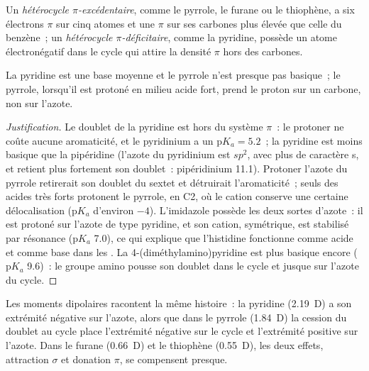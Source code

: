 \begin{definition}\label{def:b3:heterocycles:pi-character}
Un \emph{hétérocycle $\pi$-excédentaire}, comme le
pyrrole, le furane ou le thiophène, a six électrons $\pi$ sur cinq atomes et une  $\pi$ sur ses carbones plus élevée que celle du benzène~; un \emph{hétérocycle $\pi$-déficitaire}, comme la pyridine, possède un
atome électronégatif dans le cycle qui attire la densité $\pi$ hors des carbones.
\end{definition}

\begin{proposition}[Basicité]\label{prop:b3:heterocycles:basicity}
La pyridine est une base moyenne et le pyrrole n'est presque pas basique~;
le pyrrole, lorsqu'il est protoné en milieu acide fort, prend le proton sur
un carbone, non sur l'azote.
\end{proposition}

\begin{proof}[Justification]
Le doublet de la pyridine est hors du système $\pi$~: le protoner ne coûte
aucune aromaticité, et le pyridinium a un $\mathrm pK_a = 5.2$~; la pyridine est moins basique que la pipéridine
(l'azote du pyridinium est $sp^2$, avec plus de caractère s, et retient plus
fortement son doublet~: pipéridinium 11.1). Protoner l'azote du pyrrole
retirerait son doublet du sextet et détruirait l'aromaticité~; seuls des
acides très forts protonent le pyrrole, en C2, où le cation conserve une
certaine délocalisation
($\mathrm pK_a$ d'environ $-4$). L'imidazole possède les deux sortes d'azote~: il est protoné sur
l'azote de type pyridine, et son cation, symétrique, est stabilisé par résonance ($\mathrm pK_a$
7.0), ce qui explique que l'histidine fonctionne comme acide et comme base
dans les . La 4-(diméthylamino)pyridine est plus basique encore ($\mathrm pK_a$ 9.6)~: le groupe amino pousse
son doublet dans le cycle et jusque sur l'azote du cycle.
\end{proof}

Les moments dipolaires racontent la même histoire~: la pyridine (\qty{2.19}{D}) a son
extrémité négative sur l'azote, alors que dans le pyrrole (\qty{1.84}{D}) la cession du doublet au
cycle place l'extrémité négative sur le cycle et l'extrémité positive sur
l'azote. Dans le furane
(\qty{0.66}{D}) et le thiophène (\qty{0.55}{D}), les deux effets, attraction $\sigma$ et donation $\pi$, se
compensent presque.


